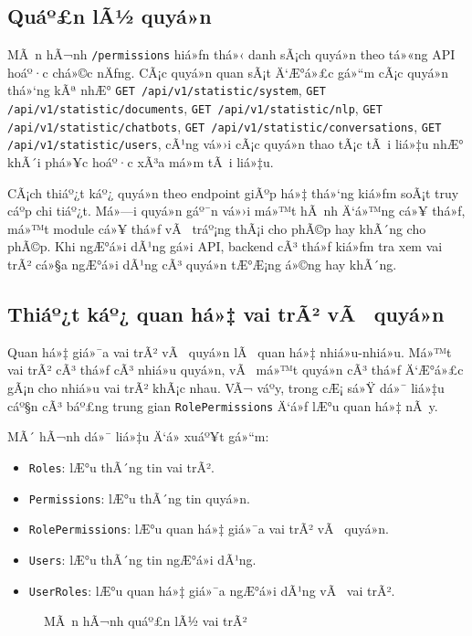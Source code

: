 ﻿\documentclass[12pt,a4paper]{report}
\begin{document}
\subsection{Quáº£n lÃ½ quyá»n}

MÃ n hÃ¬nh \texttt{/permissions} hiá»ƒn thá»‹ danh sÃ¡ch quyá»n theo tá»«ng API hoáº·c chá»©c nÄƒng. CÃ¡c quyá»n quan sÃ¡t Ä‘Æ°á»£c gá»“m cÃ¡c quyá»n thá»‘ng kÃª nhÆ° \texttt{GET /api/v1/statistic/system}, \texttt{GET /api/v1/statistic/documents}, \texttt{GET /api/v1/statistic/nlp}, \texttt{GET /api/v1/statistic/chatbots}, \texttt{GET /api/v1/statistic/conversations}, \texttt{GET /api/v1/statistic/users}, cÃ¹ng vá»›i cÃ¡c quyá»n thao tÃ¡c tÃ i liá»‡u nhÆ° khÃ´i phá»¥c hoáº·c xÃ³a má»m tÃ i liá»‡u.

CÃ¡ch thiáº¿t káº¿ quyá»n theo endpoint giÃºp há»‡ thá»‘ng kiá»ƒm soÃ¡t truy cáº­p chi tiáº¿t. Má»—i quyá»n gáº¯n vá»›i má»™t hÃ nh Ä‘á»™ng cá»¥ thá»ƒ, má»™t module cá»¥ thá»ƒ vÃ  tráº¡ng thÃ¡i cho phÃ©p hay khÃ´ng cho phÃ©p. Khi ngÆ°á»i dÃ¹ng gá»i API, backend cÃ³ thá»ƒ kiá»ƒm tra xem vai trÃ² cá»§a ngÆ°á»i dÃ¹ng cÃ³ quyá»n tÆ°Æ¡ng á»©ng hay khÃ´ng.

\subsection{Thiáº¿t káº¿ quan há»‡ vai trÃ² vÃ  quyá»n}

Quan há»‡ giá»¯a vai trÃ² vÃ  quyá»n lÃ  quan há»‡ nhiá»u-nhiá»u. Má»™t vai trÃ² cÃ³ thá»ƒ cÃ³ nhiá»u quyá»n, vÃ  má»™t quyá»n cÃ³ thá»ƒ Ä‘Æ°á»£c gÃ¡n cho nhiá»u vai trÃ² khÃ¡c nhau. VÃ¬ váº­y, trong cÆ¡ sá»Ÿ dá»¯ liá»‡u cáº§n cÃ³ báº£ng trung gian \texttt{RolePermissions} Ä‘á»ƒ lÆ°u quan há»‡ nÃ y.

MÃ´ hÃ¬nh dá»¯ liá»‡u Ä‘á» xuáº¥t gá»“m:

\begin{itemize}
    \item \texttt{Roles}: lÆ°u thÃ´ng tin vai trÃ².
    \item \texttt{Permissions}: lÆ°u thÃ´ng tin quyá»n.
    \item \texttt{RolePermissions}: lÆ°u quan há»‡ giá»¯a vai trÃ² vÃ  quyá»n.
    \item \texttt{Users}: lÆ°u thÃ´ng tin ngÆ°á»i dÃ¹ng.
    \item \texttt{UserRoles}: lÆ°u quan há»‡ giá»¯a ngÆ°á»i dÃ¹ng vÃ  vai trÃ².
\end{itemize}

\begin{figure}[H]
    \centering
    \caption{MÃ n hÃ¬nh quáº£n lÃ½ vai trÃ²}
    \label{fig:roles-management}
\end{figure}
\end{document}
